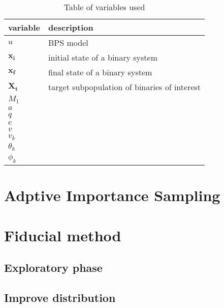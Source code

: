 \begin{table}[]
\centering
\caption{Table of variables used }
\label{my-label}
\begin{tabular}{l|l}
\hline
\textbf{variable}               & \textbf{description}           \\ \hline
\multicolumn{1}{|l|}{$u$} & \multicolumn{1}{l|}{BPS model} \\ \hline
\multicolumn{1}{|l|}{$\mathbf{x_i}$} & \multicolumn{1}{l|}{initial state of a binary system} \\ \hline
\multicolumn{1}{|l|}{$\mathbf{x_f}$} & \multicolumn{1}{l|}{final state of a binary system} \\ \hline
\multicolumn{1}{|l|}{$\mathbf{X_t}$} & \multicolumn{1}{l|}{target subpopulation of binaries of interest} \\ \hline
\multicolumn{1}{|l|}{$M_1$} & \multicolumn{1}{l|}{} \\ \hline
\multicolumn{1}{|l|}{$a$} & \multicolumn{1}{l|}{} \\ \hline
\multicolumn{1}{|l|}{$q$} & \multicolumn{1}{l|}{} \\ \hline
\multicolumn{1}{|l|}{$e$} & \multicolumn{1}{l|}{} \\ \hline
\multicolumn{1}{|l|}{$v$} & \multicolumn{1}{l|}{} \\ \hline
\multicolumn{1}{|l|}{$v_k$} & \multicolumn{1}{l|}{} \\ \hline
\multicolumn{1}{|l|}{$\theta_k$} & \multicolumn{1}{l|}{} \\ \hline
\multicolumn{1}{|l|}{$\phi_k$} & \multicolumn{1}{l|}{} \\ \hline
\end{tabular}
\end{table}



\section{Adptive Importance Sampling}
\section{Fiducial method}
\subsection{Exploratory phase}
\subsection{Improve distribution}
